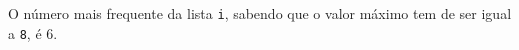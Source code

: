 \documentclass[12pt,varwidth=16cm,border=1pt]{standalone}
\begin{document}
O número mais frequente da lista \verb+i+, sabendo que o valor máximo tem de ser igual a \verb+8+, é 6.

\questiomtrue
\end{document}
